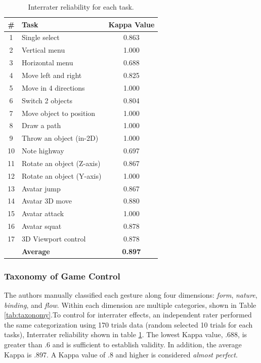 \documentclass{sigchi}
\newcommand\tabhead[1]{\small\textbf{#1}}
\begin{document}
   \begin{table}
    \centering
    \begin{tabular}{|c|l|c|}
      \hline
      \tabhead{\#} &
      \multicolumn{1}{|p{0.2\columnwidth}|}{\centering\tabhead{Task}} &
      \multicolumn{1}{|p{0.2\columnwidth}|}{\centering\tabhead{Kappa Value}} \\
      \hline
      1 & Single select & 0.863\\
      \hline
      2 & Vertical menu & 1.000\\
      \hline
      3 & Horizontal menu & 0.688\\
      \hline
      4 & Move left and right & 0.825\\
      \hline
      5 & Move in 4 directions & 1.000\\
      \hline
      6 & Switch 2 objects & 0.804\\
      \hline
      7 & Move object to position & 1.000\\
      \hline
      8 & Draw a path & 1.000\\
      \hline
      9 & Throw an object (in-2D) & 1.000\\
      \hline
      10 & Note highway & 0.697\\
      \hline
      11 & Rotate an object (Z-axis) & 0.867 \\
      \hline
      12 & Rotate an object (Y-axis) & 1.000\\
      \hline
      13 & Avatar jump & 0.867\\
      \hline
      14 & Avatar 3D move & 0.880\\
      \hline
      15 & Avatar attack & 1.000\\
      \hline
      16 & Avatar squat & 0.878\\
      \hline
      17 & 3D Viewport control & 0.878\\
      \hline
      & \bf{Average} & \bf{0.897}\\
      \hline

    \end{tabular}
    \caption{Interrater reliability for each task.}
    \label{tab:kappa}
  \end{table}


  \subsubsection{Taxonomy of Game Control}

  The authors manually classified each gesture along four dimensions: \emph{form}, \emph{nature}, \emph{binding}, and \emph{flow}. Within each dimension are multiple categories, shown in Table \ref{tab:taxonomy}.To control for interrater effects, an independent rater performed the same categorization using 170 trials data (random selected 10 trials for each tasks), Interrater reliability shown in table \ref{tab:kappa}. The lowest Kappa value, .688, is greater than .6 and is sufficient to establish validity. In addition, the average Kappa is .897. A Kappa value of .8 and higher is considered \textsl{almost perfect}.
\end{document}

